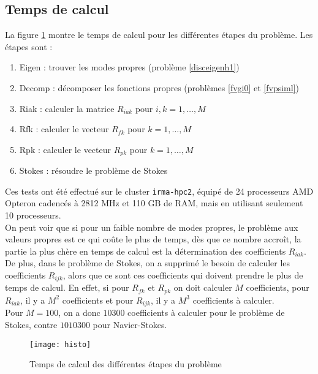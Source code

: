 \subsection{Temps de calcul}
La figure \ref{histo} montre le temps de calcul pour les différentes étapes du problème. Les étapes sont :
\begin{enumerate}
\item Eigen : trouver les modes propres (problème \ref{disceigenh1})
\item Decomp : décomposer les fonctions propres (problèmes \ref{fvgi0} et \ref{fvpsiml})
\item Riak : calculer la matrice $R_{iak}$ pour $i,k=1,\dots,M$
\item Rfk : calculer le vecteur $R_{fk}$ pour $k=1,\dots,M$
\item Rpk : calculer le vecteur $R_{pk}$ pour $k=1,\dots,M$
\item Stokes : résoudre le problème de Stokes
\end{enumerate}
Ces tests ont été effectué sur le cluster \texttt{irma-hpc2}, équipé de 24 processeurs AMD Opteron cadencés à 2812 MHz et 110 GB de RAM, mais en utilisant seulement 10 processeurs.\\

On peut voir que si pour un faible nombre de modes propres, le problème aux valeurs propres est ce qui coûte le plus de temps, dès que ce nombre accroît, la partie la plus chère en temps de calcul est la détermination des coefficients $R_{iak}$.\\
De plus, dans le problème de Stokes, on a supprimé le besoin de calculer les coefficients $R_{ijk}$, alors que ce sont ces coefficients qui doivent prendre le plus de temps de calcul. En effet, si pour $R_{fk}$ et $R_{pk}$ on doit calculer $M$ coefficients, pour $R_{iak}$, il y a $M^2$ coefficients et pour $R_{ijk}$, il y a $M^3$ coefficients à calculer.\\
Pour $M=100$, on a donc $10300$ coefficients à calculer pour le problème de Stokes, contre $1010300$ pour Navier-Stokes.

\begin{figure}[H]
\centering
\texttt{[image: histo]}
\caption{Temps de calcul des différentes étapes du problème}\label{histo}
\end{figure}


